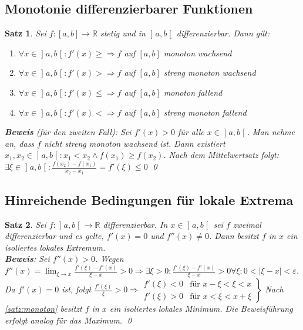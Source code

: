 \documentclass[ngerman,titlepage,twoside, parskip=half*]{scrreprt}
\newcommand*{\R}{\mathbb{R}}
\theoremstyle{plain}
\newtheorem{theorem}{Satz}[section]
\theoremstyle{definition}
\theoremstyle{remark}
\newcommand*{\bsofint}[1]{\mathopen{]}#1\mathclose{[}} %
\begin{document}
\subsection{Monotonie differenzierbarer Funktionen}
\begin{theorem}
  \label{satz:monoton}
  Sei $f\colon[a,b]\rightarrow\R$ stetig und in $\bsofint{a,b}$ differenzierbar. Dann
  gilt:
  \begin{enumerate}
    \item $\forall x \in \bsofint{a,b}\colon f'(x)\geq \Rightarrow f$ auf $[a,b]$
      monoton wachsend
    \item $\forall x \in \bsofint{a,b}\colon f'(x)> \Rightarrow f$ auf $[a,b]$ 
      streng monoton wachsend
    \item $\forall x \in \bsofint{a,b}\colon f'(x)\leq \Rightarrow f$ auf $[a,b]$
      monoton fallend
    \item $\forall x \in \bsofint{a,b}\colon f'(x)< \Rightarrow f$ auf $[a,b]$
      streng monoton fallend
  \end{enumerate}
  \textbf{Beweis} (für den zweiten Fall): Sei $f'(x)>0$ für alle $x\in
  \bsofint{a,b}$. Man nehme an, dass $f$ nicht streng monoton wachsend ist. Dann
  existiert $x_1,x_2\in\bsofint{a,b}\colon x_1<x_2\wedge f(x_1)\geq f(x_2)$. Nach dem
  Mittelwertsatz folgt: $\exists \xi\in\bsofint{a,b}\colon\frac{f(x_2)-f(x_1)}{x_2-x_1}
  =f'(\xi)\leq 0$\textnormal{\lightning}
  \qed
\end{theorem}

\subsection{Hinreichende Bedingungen für lokale Extrema}
\begin{theorem}
  \label{satz:lokExtrema}
  Sei $f\colon\bsofint{a,b}\rightarrow\R$ differenzierbar. In $x \in \bsofint{a,b}$ sei $f$
  zweimal differenzierbar und es gelte, $f'(x)=0$ und $f''(x)\neq 0$.
  Dann besitzt $f$ in $x$ ein isoliertes lokales Extremum.\\
  \textbf{Beweis}: Sei $f''(x)>0$. Wegen $f''(x)=\lim_{\xi\rightarrow x}
  \frac{f'(\xi)-f'(x)}{\xi-x}>0\Rightarrow\exists\xi>0\colon
  \frac{f'(\xi)-f'(x)}{\xi-x}>0 \forall\xi\colon0<|\xi-x|<\varepsilon$.
  Da $f'(x)=0$ ist, folgt $\frac{f'(\xi)}{\xi}>0\Rightarrow
  \left.
  \begin{array}{rcl}
    f'(\xi)<0 & \text{für } x-\xi<\xi<x\\
    f'(\xi)>0 & \text{für } x<\xi<x+\xi
  \end{array}\right\}$ Nach \autoref{satz:monoton} besitzt $f$ in $x$
  ein isoliertes lokales Minimum. Die Beweisführung erfolgt analog für
  das Maximum.
  \qed
\end{theorem}
\end{document}
